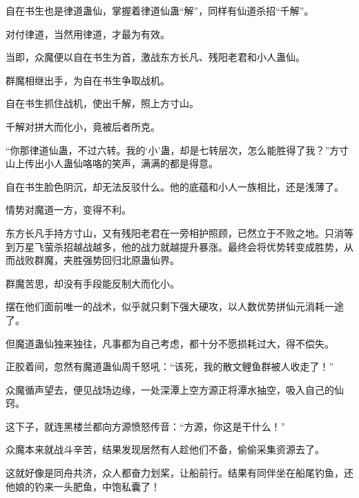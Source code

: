 \begin{this_body}
自在书生也是律道蛊仙，掌握着律道仙蛊“解”，同样有仙道杀招“千解”。

对付律道，当然用律道，才最为有效。

当即，众魔便以自在书生为首，激战东方长凡、残阳老君和小人蛊仙。

群魔相继出手，为自在书生争取战机。

自在书生抓住战机，使出千解，照上方寸山。

千解对拼大而化小，竟被后者所克。

“你那律道仙蛊，不过六转。我的‘小’蛊，却是七转层次，怎么能胜得了我？”方寸山上传出小人蛊仙咯咯的笑声，满满的都是得意。

自在书生脸色阴沉，却无法反驳什么。他的底蕴和小人一族相比，还是浅薄了。

情势对魔道一方，变得不利。

东方长凡手持方寸山，又有残阳老君在一旁相护照顾，已然立于不败之地。只消等到万星飞萤杀招越战越多，他的战力就越提升暴涨。最终会将优势转变成胜势，从而战败群魔，夹胜强势回归北原蛊仙界。

群魔苦思，却没有手段能反制大而化小。

摆在他们面前唯一的战术，似乎就只剩下强大硬攻，以人数优势拼仙元消耗一途了。

但魔道蛊仙独来独往，凡事都为自己考虑，都十分不愿损耗过大，得不偿失。

正胶着间，忽然有魔道蛊仙周千怒吼：“该死，我的散文鲤鱼群被人收走了！”

众魔循声望去，便见战场边缘，一处深潭上空方源正将潭水抽空，吸入自己的仙窍。

这下子，就连黑楼兰都向方源愤怒传音：“方源，你这是干什么！”

众魔本来就战斗辛苦，结果发现居然有人趁他们不备，偷偷采集资源去了。

这就好像是同舟共济，众人都奋力划桨，让船前行。结果有同伴坐在船尾钓鱼，还他娘的钓来一头肥鱼，中饱私囊了！

\end{this_body}

